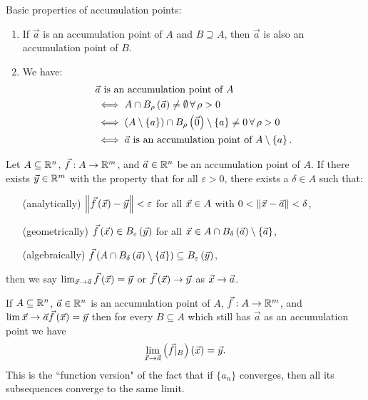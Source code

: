 \documentclass[main.tex]{subfiles}
\begin{document}
Basic properties of accumulation points:
\begin{enumerate}
    \item If $\vec{a}$ is an accumulation point of $A$ and $B\supseteq A$, then $\vec{a}$ is also an accumulation point of $B$.
    \item We have:
    \begin{align*}
    &\vec{a}\text{ is an accumulation point of }A \\
    &\iff A\cap B_\rho\left( \vec{a} \right)\neq \emptyset\,\forall\,\rho > 0 \\
    &\iff \left( A\setminus \left\{ a \right\} \right)\cap B_\rho\left( \vec{0} \right) \setminus \{a\} \neq 0 \,\forall\, \rho > 0 \\
    &\iff \vec{a}\text{ is an accumulation point of }A\setminus \left\{ a \right\}.
    \end{align*}
\end{enumerate}

\begin{definition}
    Let $A\subseteq \mathbb R^n$, $\vec{f} : A\to \mathbb R^m$, and $\vec{a}\in \mathbb R^n$ be an accumulation point of $A$. If there exists $\vec{y}\in \mathbb R^m$ with the property that for all $\varepsilon > 0$, there exists a $\delta\in A$ such that:
    \begin{enumerate}
        \item[(analytically)] $\left\lVert \vec{f}\left( \vec{x} \right) - \vec{y} \right\rVert < \varepsilon$ for all $\vec{x}\in A$ with $0 < \left\lVert \vec{x} - \vec{a} \right\rVert < \delta$,
        \item[(geometrically)] $\vec{f}\left( \vec{x} \right) \in B_\varepsilon\left( \vec{y} \right)$ for all $\vec{x}\in A\cap B_\delta\left( \vec{a} \right)\setminus \left\{ \vec{a} \right\}$,
        \item[(algebraically)] $\vec{f}\left( A\cap B_\delta\left( \vec{a} \right)\setminus\left\{ \vec{a} \right\} \right) \subseteq B_\varepsilon\left( \vec{y} \right)$,
    \end{enumerate}
    then we say $\lim_{\vec{x}\to \vec{a}} \vec{f}\left( \vec{x} \right) = \vec{y}$ or $\vec{f}\left( \vec{x} \right)\to\vec{y}$ as $\vec{x}\to\vec{a}$.
\end{definition}

\begin{remark}
    If $A\subseteq \mathbb R^n$, $\vec{a}\in \mathbb R^n$ is an accumulation point of $A$, $\vec{f} : A\to \mathbb R^m$, and $\lim{\vec{x}\to\vec{a}} \vec{f}\left( \vec{x} \right) = \vec{y}$ then for every $B\subseteq A$ which still has $\vec{a}$ as an accumulation point we have \[\lim_{\vec{x}\to\vec{a}}\left( \vec{f}|_B \right)\left( \vec{x} \right) = \vec{y}.\] This is the ``function version" of the fact that if $\{a_n\}$ converges, then all its subsequences converge to the same limit.
\end{remark}
\end{document}
